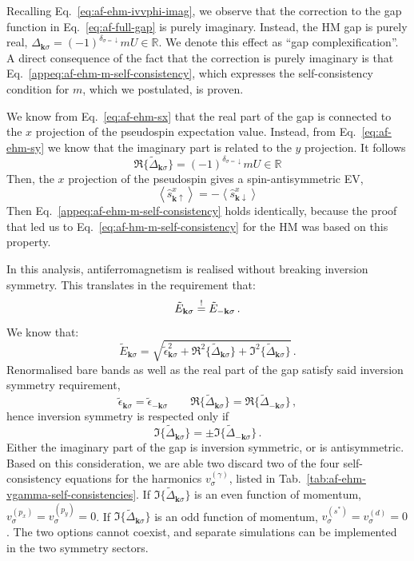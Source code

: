 Recalling Eq.~\eqref{eq:af-ehm-ivvphi-imag}, we observe that the correction to the gap function in Eq.~\eqref{eq:af-full-gap} is purely imaginary. Instead, the HM gap is purely real, $\Delta_{\mathbf{k}\sigma} = (-1)^{\delta_{\sigma=\downarrow}} mU \in \mathbb{R}$. We denote this effect as ``gap complexification''. A direct consequence of the fact that the correction is purely imaginary is that Eq.~\eqref{appeq:af-ehm-m-self-consistency}, which expresses the self-consistency condition for $m$, which we postulated, is proven.

\begin{tabproof}
	
	We know from Eq.~\eqref{eq:af-ehm-sx} that the real part of the gap is connected to the $x$ projection of the pseudospin expectation value. Instead, from Eq.~\eqref{eq:af-ehm-sy} we know that the imaginary part is related to the $y$ projection. It follows
	\[
	\Re \lbrace \tilde{\Delta}_{\mathbf{k}\sigma} \rbrace = (-1)^{\delta_{\sigma=\downarrow}} mU \in \mathbb{R}
	\]
	Then, the $x$ projection of the pseudospin gives a spin-antisymmetric EV,	
	\[
	\left\langle \hat s_{\mathbf{k}\uparrow}^x \right\rangle = -\left\langle \hat s_{\mathbf{k}\downarrow}^x \right\rangle
	\]
	Then Eq.~\eqref{appeq:af-ehm-m-self-consistency} holds identically, because the proof that led us to Eq.~\eqref{eq:af-hm-m-self-consistency} for the HM was based on this property.
\end{tabproof}

In this analysis, antiferromagnetism is realised without breaking inversion symmetry. This translates in the requirement that:
\[
\tilde{E}_{\mathbf{k}\sigma} \stackrel{!}{=} \tilde{E}_{-\mathbf{k}\sigma} \, .
\]
We know that:
\[
\tilde{E}_{\mathbf{k}\sigma} = \sqrt{
	\tilde{\epsilon}_{\mathbf{k}\sigma}^2 + \Re^2\lbrace \tilde{\Delta}_{\mathbf{k}\sigma}\rbrace+ \Im^2\lbrace \tilde{\Delta}_{\mathbf{k}\sigma}\rbrace
} \, .
\]
Renormalised bare bands as well as the real part of the gap satisfy said inversion symmetry requirement,
\[
\tilde{\epsilon}_{\mathbf{k}\sigma} = \tilde{\epsilon}_{-\mathbf{k}\sigma}
\qquad
\Re\lbrace \tilde{\Delta}_{\mathbf{k}\sigma}\rbrace = \Re\lbrace \tilde{\Delta}_{-\mathbf{k}\sigma}\rbrace \, ,
\]
hence inversion symmetry is respected only if
\[
\Im\lbrace \tilde{\Delta}_{\mathbf{k}\sigma}\rbrace = \pm\Im\lbrace \tilde{\Delta}_{-\mathbf{k}\sigma}\rbrace \, .
\]
Either the imaginary part of the gap is inversion symmetric, or is antisymmetric. Based on this consideration, we are able two discard two of the four self-consistency equations for the harmonics $v_\sigma^{(\gamma)}$, listed in Tab.~\ref{tab:af-ehm-vgamma-self-consistencies}. If $\Im\lbrace \tilde{\Delta}_{\mathbf{k}\sigma}\rbrace$ is an even function of momentum, $v_\sigma^{(p_x)} = v_\sigma^{(p_y)} = 0$. If $\Im\lbrace \tilde{\Delta}_{\mathbf{k}\sigma}\rbrace$ is an odd function of momentum, $v_\sigma^{(s^*)} = v_\sigma^{(d)} = 0$. The two options cannot coexist, and separate simulations can be implemented in the two symmetry sectors.

